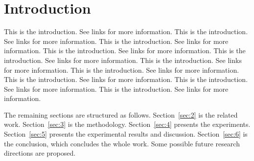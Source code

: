 \section{Introduction}
\label{sec:1}

This is the introduction. See links \cite{linkEnglish, linkChinese, linkScript} for more information. This is the introduction. See links \cite{linkEnglish, linkChinese, linkScript} for more information. This is the introduction. See links \cite{linkEnglish, linkChinese, linkScript} for more information. This is the introduction. See links \cite{linkEnglish, linkChinese, linkScript} for more information. This is the introduction. See links \cite{linkEnglish, linkChinese, linkScript} for more information. This is the introduction. See links \cite{linkEnglish, linkChinese, linkScript} for more information. This is the introduction. See links \cite{linkEnglish, linkChinese, linkScript} for more information. This is the introduction. See links \cite{linkEnglish, linkChinese, linkScript} for more information. This is the introduction. See links \cite{linkEnglish, linkChinese, linkScript} for more information. This is the introduction. See links \cite{linkEnglish, linkChinese, linkScript} for more information. 

The remaining sections are structured as follows. Section~\ref{sec:2} is the related work. Section~\ref{sec:3} is the methodology. Section~\ref{sec:4} presents the experiments. Section~\ref{sec:5} presents the experimental results and discussion. Section~\ref{sec:6} is the conclusion, which concludes the whole work. Some possible future research directions are proposed. 
